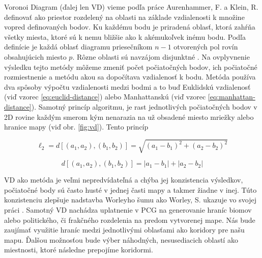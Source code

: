Voronoi Diagram (ďalej len VD) vieme podľa práce Aurenhammer, F. a Klein, R. definovať ako priestor rozdelený na oblasti na základe vzdialenosti k množine vopred definovaných bodov. Ku každému bodu je priradená oblasť, ktorá zahŕňa všetky miesta, ktoré sú k nemu bližšie ako k akémukoľvek inému bodu. Podľa definície je každá oblasť diagramu priesečníkom \(n-1\) otvorených pol rovín obsahujúcich miesto \(p\). Rôzne oblasti sú navzájom disjunktné \cite{aurenhammer2000voronoi}.
Na ovplyvnenie výsledku tejto metódy môžeme zmeniť počet počiatočných bodov, ich počiatočné rozmiestnenie a metódu akou sa dopočítava vzdialenosť k bodu. Metóda používa dva spôsoby výpočtu vzdialenosti medzi bodmi a to buď Euklidskú vzdialenosť (viď vzorec \ref{eq:euclid-distance}) alebo Manhattanskú (viď vzorec \ref{eq:manhattan-distance}). Samotný princíp algoritmu, je rast jednotlivých počiatočných bodov v 2D rovine každým smerom kým nenarazia na už obsadené miesto mriežky alebo hranice mapy (viď obr. \ref{fig:vd}). Tento princíp 

\begin{equation} \label{eq:euclid-distance}
\ell_{2} = d\left[\left(a_{1}, a_{2}\right), \left(b_{1}, b_{2}\right)\right] = \sqrt{(a_{1} - b_{1})^{2} + (a_{2} - b_{2})^{2}}
\end{equation}

\begin{equation} \label{eq:manhattan-distance}
d\left[\left(a_{1}, a_{2}\right), \left(b_{1}, b_{2}\right)\right] = \left| a_{1} - b_{1} \right| + \left| a_{2} - b_{2} \right|
\end{equation}

VD ako metóda je veľmi nepredvídateľná a chýba jej konzistencia výsledkov, počiatočné body sú často husté v jednej časti mapy a takmer žiadne v inej. Túto konzistenciu zlepšuje nadstavba Worleyho šumu ako Worley, S. ukazuje vo svojej práci \cite{worley1996cellular}. Samotný VD nachádza uplatnenie v PCG na generovanie hraníc biomov alebo politického, či frakčného rozdelenia na predom vytvorenej mape. Nás bude zaujímať využitie hraníc medzi jednotlivými oblasťami ako koridory pre našu mapu. Ďalšou možnosťou bude výber náhodných, nesusediacich oblastí ako miestnosti, ktoré následne prepojíme koridormi.

